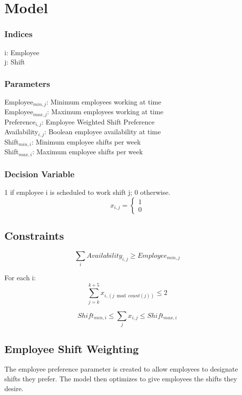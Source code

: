 \chapter{Model}

\subsection{Indices}
i: Employee\\
j: Shift\\

\subsection{Parameters}
Employee$_{min,j}$: Minimum employees working at time\\
Employee$_{max,j}$: Maximum employees working at time\\
Preference$_{i,j}$: Employee Weighted Shift Preference\\
Availability$_{i,j}$: Boolean employee availability at time\\
Shift$_{min,i}$: Minimum employee shifts per week\\
Shift$_{max,i}$: Maximum employee shifts per week

\subsection{Decision Variable}
1 if employee i is scheduled to work shift j; 0 otherwise.
$$x_{i,j} =
 \begin{cases}
   1 \\
   0 
   
 \end{cases}
 $$

\section{Constraints}

$$\sum\limits_{i} Availability_{i,j} \ge Employee_{min,j}$$

 For each i: \\
$$\sum\limits_{j = k}^{k+5} x_{i,( j\bmod{count(j)})} \le 2 $$

$$ Shift_{min,i}\le \sum\limits_{j}x_{i,j} \le Shift_{max,i}$$


\section{Employee Shift Weighting}
The employee preference parameter is created to allow employees to designate shifts they prefer. The model then optimizes to give employees the shifts they desire. 

